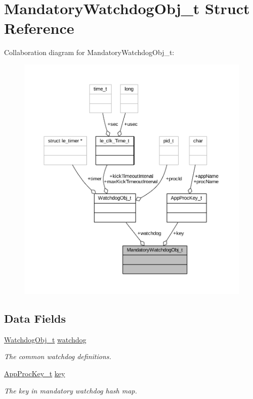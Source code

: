 \hypertarget{struct_mandatory_watchdog_obj__t}{}\section{Mandatory\+Watchdog\+Obj\+\_\+t Struct Reference}
\label{struct_mandatory_watchdog_obj__t}


Collaboration diagram for Mandatory\+Watchdog\+Obj\+\_\+t\+:
\nopagebreak
\begin{figure}[H]
\begin{center}
\leavevmode
\includegraphics[width=350pt]{struct_mandatory_watchdog_obj__t__coll__graph}
\end{center}
\end{figure}
\subsection*{Data Fields}
\begin{DoxyCompactItemize}
\item 
\hyperlink{struct_watchdog_obj__t}{Watchdog\+Obj\+\_\+t} \hyperlink{struct_mandatory_watchdog_obj__t_a3362da802fcff3348e3b47d15823c2be}{watchdog}
\begin{DoxyCompactList}\small\item\em The common watchdog definitions. \end{DoxyCompactList}\item 
\hyperlink{struct_app_proc_key__t}{App\+Proc\+Key\+\_\+t} \hyperlink{struct_mandatory_watchdog_obj__t_a20ce97540d922e2df34c45e8d2b01255}{key}
\begin{DoxyCompactList}\small\item\em The key in mandatory watchdog hash map. \end{DoxyCompactList}\end{DoxyCompactItemize}


